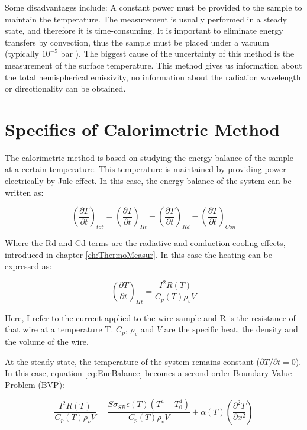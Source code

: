 Some disadvantages include: A constant power must be provided to the sample to maintain the temperature. The measurement is usually performed in a steady state, and therefore it is time-consuming. It is important to eliminate energy transfers by convection, thus the sample must be placed under a vacuum (typically $10^{-5}$ bar ). The biggest cause of the uncertainty of this method is the measurement of the surface temperature. This method gives us information about the total hemispherical emissivity, no information about the radiation wavelength or directionality can be obtained. 

\section{Specifics of Calorimetric Method}

The calorimetric method is based on studying the energy balance of the sample at a certain temperature. This temperature is maintained by providing power electrically by Jule effect. In this case, the energy balance of the system can be written as:

\begin{equation}
    \left(\frac{\partial T}{\partial t}\right)_{tot} = \left(\frac{\partial T}{\partial t}\right)_{Ht} - \left(\frac{\partial T}{\partial t}\right)_{Rd} - \left(\frac{\partial T}{\partial t}\right)_{Con}
    \label{eq:EneBalance}
\end{equation}

Where the Rd and Cd terms are the radiative and conduction cooling effects, introduced in chapter \ref{ch:ThermoMeasur}. In this case the heating can be expressed as: 

\begin{equation}
    \left(\frac{\partial T}{\partial t}\right)_{Ht} = \frac{I^2 R(T)}{C_p(T)\rho_v V}
\end{equation}

Here, I refer to the current applied to the wire sample and R is the resistance of that wire at a temperature T. $C_p$, $\rho_v$ and $V$ are the specific heat, the density and the volume of the wire. 

At the steady state, the temperature of the system remains constant ($\partial T/ \partial t = 0$). In this case, equation \ref{eq:EneBalance} becomes a second-order Boundary Value Problem (BVP): 

\begin{equation}
    \frac{I^2 R(T)}{C_p(T)\rho_v V} =  \frac{S \sigma_{SB} \epsilon(T) \left( T^4 - T_{0}^{4}\right)}{C_p (T) \rho_v V} + \alpha(T)\left(\frac{\partial^2T}{\partial x^2}\right)
    \label{eq:ExplicitEneBalance}
\end{equation}

